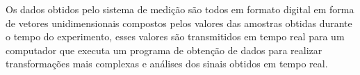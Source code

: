 Os dados obtidos pelo sistema de medição são todos em formato digital em forma de vetores unidimensionais compostos pelos valores das amostras obtidas durante o tempo do
experimento, esses valores são transmitidos em tempo real para um computador que executa um programa de obtenção de dados para realizar transformações mais complexas e
análises dos sinais obtidos em tempo real.
%
%
%
%
%
%
%
%
%
